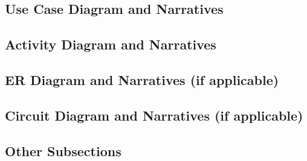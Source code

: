 \subsection{Use Case Diagram and Narratives}


\subsection{Activity Diagram and Narratives}

\subsection{ER Diagram and Narratives (if applicable)}


\subsection{Circuit Diagram and Narratives (if applicable)}


\subsection{Other Subsections}

